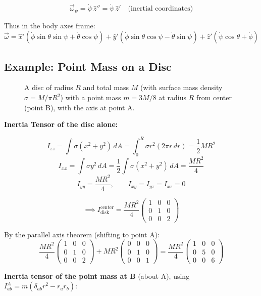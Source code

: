 \[
    \vec{\omega}_\psi = \dot{\psi}\,\hat{z}'' = \dot{\psi}\,\hat{z}'
    \quad\text{(inertial coordinates)}
\]

Thus in the body axes frame:
\[
    \vec{\omega} = \hat{x}'(\dot{\phi}\sin\theta\sin\psi + \dot{\theta}\cos\psi)
                + \hat{y}'(\dot{\phi}\sin\theta\cos\psi - \dot{\theta}\sin\psi)
                + \hat{z}'(\dot{\psi}\cos\theta + \dot{\phi})
\]

\subsection{Example: Point Mass on a Disc}

\begin{figure}[H]
    \centering
    \caption{A disc of radius $R$ and total mass $M$ (with surface mass density $\sigma = M/\pi R^2$) with a point mass $m = 3M/8$ at radius $R$ from center (point B), with the axis at point A.}
\end{figure}

\textbf{Inertia Tensor of the disc alone:}

\[
    I_{zz} = \int\sigma(x^2+y^2)\,dA = \int_0^R \sigma r^2(2\pi r\,dr) = \frac{1}{2}MR^2
\]
\[
    I_{xx} = \int\sigma y^2\,dA = \frac{1}{2}\int\sigma(x^2+y^2)\,dA = \frac{MR^2}{4}
\]
\[
    I_{yy} = \frac{MR^2}{4},\qquad I_{xy} = I_{yz} = I_{xz} = 0
\]

\[
    \implies I_{\text{disk}}^{\text{center}} = \frac{MR^2}{4}\begin{pmatrix}1&0&0\\0&1&0\\0&0&2\end{pmatrix}
\]

By the parallel axis theorem (shifting to point A):
\[
    \frac{MR^2}{4}\begin{pmatrix}1&0&0\\0&1&0\\0&0&2\end{pmatrix}
    + MR^2\begin{pmatrix}0&0&0\\0&1&0\\0&0&1\end{pmatrix}
    = \frac{MR^2}{4}\begin{pmatrix}1&0&0\\0&5&0\\0&0&6\end{pmatrix}
\]

\textbf{Inertia tensor of the point mass at B} (about A), using $I_{ab}^A = m(\delta_{ab}r^2 - r_a r_b)$:


